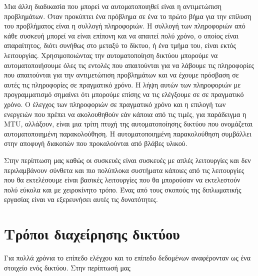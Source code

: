 Μια άλλη διαδικασία που μπορεί να αυτοματοποιηθεί είναι η αντιμετώπιση προβλημάτων. Όταν προκύπτει ένα πρόβλημα σε ένα 
το πρώτο βήμα για την επίλυση του προβλήματος είναι η συλλογή πληροφοριών. Η συλλογή των πληροφοριών από κάθε συσκευή μπορεί να είναι επίπονη και να απαιτεί πολύ χρόνο, ο οποίος είναι απαραίτητος, διότι συνήθως στο μεταξύ το δίκτυο, ή ένα τμήμα του, είναι εκτός λειτουργίας.
Χρησιμοποιώντας την αυτοματοποίηση δικτύου μπορούμε να αυτοματοποιήσουμε όλες τις εντολές που απαιτούνται για να λάβουμε τις πληροφορίες που απαιτούνται για την αντιμετώπιση προβλημάτων και να έχουμε πρόσβαση σε αυτές τις πληροφορίες σε πραγματικό χρόνο.
Η λήψη αυτών των πληροφοριών με προγραμματισμό σημαίνει ότι μπορούμε επίσης να τις ελέγξουμε σε  σε πραγματικό χρόνο. Ο έλεγχος των πληροφοριών σε πραγματικό χρόνο και η 
επιλογή των ενεργειών που πρέπει να ακολουθηθούν εάν κάποια από τις τιμές, για παράδειγμα η MTU, αλλάξουν, 
είναι μια τρίτη πτυχή της αυτοματοποίησης δικτύου που ονομάζεται αυτοματοποιημένη παρακολούθηση.
Η αυτοματοποιημένη παρακολούθηση συμβάλλει στην αποφυγή διακοπών που προκαλούνται από βλάβες υλικού.

Στην περίπτωση μας καθώς οι συσκευές είναι συσκευές με απλές λειτουργίες και δεν περιλαμβάνουν σύνθετα και πιο πολύπλοκα συστήματα κάποιες από τις λειτουργίες
που θα εκτελέσουμε είναι βασικές λειτουργίες που θα μπορούσαν να εκτελεστούν πολύ εύκολα και με χειροκίνητο τρόπο. Ένας από τους σκοπούς της διπλωματικής εργασίας
είναι να εξερευνήσει αυτές τις δυνατότητες.

\section{Τρόποι διαχείρησης δικτύου}
Για πολλά χρόνια το επίπεδο ελέγχου και το επίπεδο δεδομένων αναφέρονταν ως ένα στοιχείο ενός δικτύου. Στην περίπτωσή μας  









